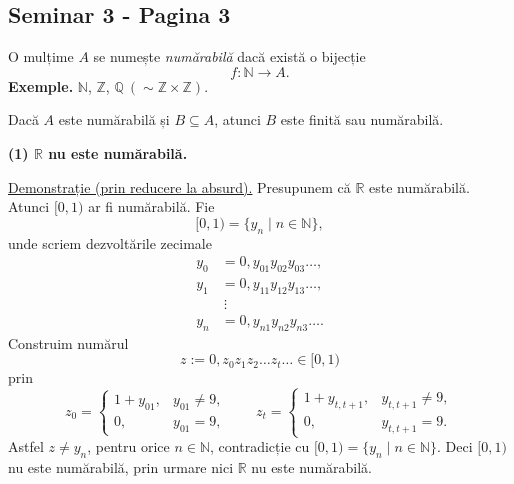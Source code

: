 
\subsection*{Seminar 3 - Pagina 3}

\noindent O mulțime $A$ se numește \emph{numărabilă} dacă există o
bijecție
\[
 f:\mathbb N\longrightarrow A.
\]
\noindent\textbf{Exemple.} $\mathbb N$, $\mathbb Z$,
$\mathbb Q\ (\sim\mathbb Z\times\mathbb Z)$.

\noindent Dacă $A$ este numărabilă și $B\subseteq A$, atunci $B$ este
finită sau numărabilă.

\medskip
\noindent\textbf{(1) $\mathbb R$ nu este numărabilă.}

\noindent\underline{Demonstrație (prin reducere la absurd).}
Presupunem că $\mathbb R$ este numărabilă. Atunci $[0,1)$ ar fi
numărabilă. Fie
\[
 [0,1)=\{y_n\mid n\in\mathbb N\},
\]
unde scriem dezvoltările zecimale
\[
\begin{aligned}
 y_0 &= 0,y_{01}y_{02}y_{03}\ldots,\\
 y_1 &= 0,y_{11}y_{12}y_{13}\ldots,\\
     &\ \vdots\\
 y_n &= 0,y_{n1}y_{n2}y_{n3}\ldots .
\end{aligned}
\]
Construim numărul
\[
 z:=0,z_0z_1z_2\ldots z_t\ldots\in[0,1)
\]
prin
\[
 z_0=\begin{cases}
       1+y_{01},&y_{01}\neq9,\\
       0,&y_{01}=9,
     \end{cases}
 \qquad
 z_t=\begin{cases}
       1+y_{t,t+1},&y_{t,t+1}\neq9,\\
       0,&y_{t,t+1}=9.
     \end{cases}
\]
Astfel $z\neq y_n$, pentru orice $n\in\mathbb N$, contradicție cu
$[0,1)=\{y_n\mid n\in\mathbb N\}$.
Deci $[0,1)$ nu este numărabilă, prin urmare nici
$\mathbb R$ nu este numărabilă.

